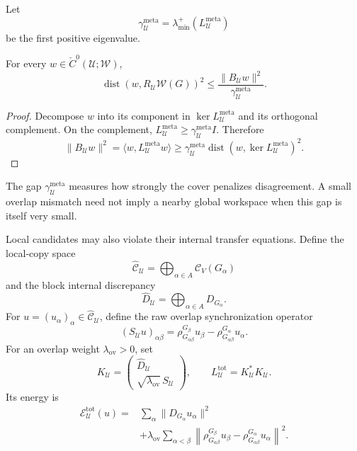 Let
\[
\gamma_{\mathcal U}^{\mathrm{meta}}
=
\lambda_{\min}^+
\left(L_{\mathcal U}^{\mathrm{meta}}\right)
\]
be the first positive eigenvalue.

\begin{SRWTproposition}\label{SRWT:prop:approx-overlap-gluing}
For every \(w\in\check C^0(\mathcal U;\mathscr W)\),
\[
\boxed{
\operatorname{dist}
\left(
 w,
 R_{\mathcal U}\mathscr W(G)
\right)^2
\leq
\frac{\|B_{\mathcal U}w\|^2}
{\gamma_{\mathcal U}^{\mathrm{meta}}}.
}
\]
\end{SRWTproposition}

\begin{proof}
Decompose \(w\) into its component in \(\ker L_{\mathcal U}^{\mathrm{meta}}\)
and its orthogonal complement. On the complement,
\(L_{\mathcal U}^{\mathrm{meta}}\geq
\gamma_{\mathcal U}^{\mathrm{meta}}I\). Therefore
\[
\|B_{\mathcal U}w\|^2
=
\langle w,L_{\mathcal U}^{\mathrm{meta}}w\rangle
\geq
\gamma_{\mathcal U}^{\mathrm{meta}}
\operatorname{dist}
\left(w,\ker L_{\mathcal U}^{\mathrm{meta}}\right)^2.
\]
\end{proof}

The gap \(\gamma_{\mathcal U}^{\mathrm{meta}}\) measures how strongly the cover
penalizes disagreement. A small overlap mismatch need not imply a nearby
global workspace when this gap is itself very small.


Local candidates may also violate their internal transfer equations. Define
the local-copy space
\[
\widehat{\mathcal C}_{\mathcal U}
=
\bigoplus_{\alpha\in A}\mathcal C_V(G_\alpha)
\]
and the block internal discrepancy
\[
\widehat D_{\mathcal U}
=
\bigoplus_{\alpha\in A}D_{G_\alpha}.
\]
For \(u=(u_\alpha)_\alpha\in\widehat{\mathcal C}_{\mathcal U}\), define the
raw overlap synchronization operator
\[
(S_{\mathcal U}u)_{\alpha\beta}
=
\rho_{G_{\alpha\beta}}^{G_\beta}u_\beta
-
\rho_{G_{\alpha\beta}}^{G_\alpha}u_\alpha.
\]
For an overlap weight \(\lambda_{\mathrm{ov}}>0\), set
\[
\boxed{
K_{\mathcal U}
=
\begin{pmatrix}
\widehat D_{\mathcal U}\\[0.2em]
\sqrt{\lambda_{\mathrm{ov}}}\,S_{\mathcal U}
\end{pmatrix},
\qquad
L_{\mathcal U}^{\mathrm{tot}}
=
K_{\mathcal U}^*K_{\mathcal U}.
}
\]
Its energy is
\[
\boxed{
\begin{aligned}
\mathcal E_{\mathcal U}^{\mathrm{tot}}(u)
={}&
\sum_\alpha\|D_{G_\alpha}u_\alpha\|^2\\
&+
\lambda_{\mathrm{ov}}
\sum_{\alpha<\beta}
\left\|
\rho^{G_\beta}_{G_{\alpha\beta}}u_\beta
-
\rho^{G_\alpha}_{G_{\alpha\beta}}u_\alpha
\right\|^2.
\end{aligned}
}
\]

